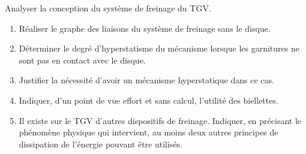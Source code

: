 \documentclass[10pt,fleqn]{article} %
\begin{document}
\begin{multicols}{2}
\begin{obj}
Analyser la conception du système de freinage du TGV.
\end{obj}

\begin{enumerate}
\item Réaliser le graphe des liaisons du système de freinage sans le disque.
\item Déterminer le degré d’hyperstatisme du mécanisme lorsque les garnitures ne sont pas en contact
avec le disque.
\item Justifier la nécessité d’avoir un mécanisme hyperstatique dans ce cas.
\item Indiquer, d’un point de vue effort et sans calcul, l’utilité des biellettes.
\item Il existe sur le TGV d’autres dispositifs de freinage. Indiquer, en précisant le phénomène physique qui intervient, au moins deux autres principes de dissipation de l’énergie pouvant être utilisés.
\end{enumerate}

%
\end{multicols}
\end{document}
